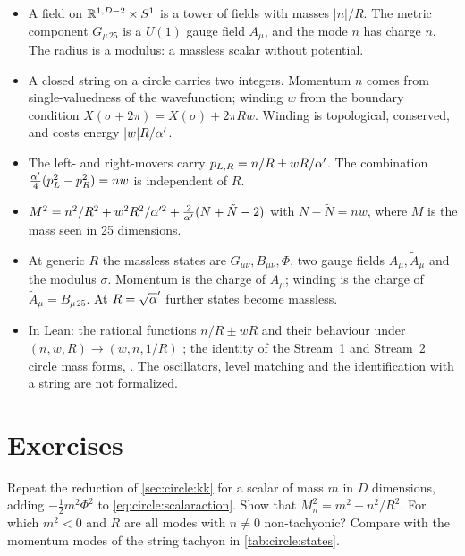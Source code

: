 \begin{summarybox}
\begin{itemize}[leftmargin=*]
\item A field on $\mathbb{R}^{1,D-2}\times S^1$ is a tower of fields with masses $|n|/R$. The metric
component $G_{\mu\,25}$ is a $U(1)$ gauge field $A_\mu$, and the mode $n$ has charge $n$. The
radius is a modulus: a massless scalar without potential.
\item A closed string on a circle carries two integers. Momentum $n$ comes from
single-valuedness of the wavefunction; winding $w$ from the boundary condition
$X(\sigma+2\pi)=X(\sigma)+2\pi Rw$. Winding is topological, conserved, and costs energy
$|w|R/\alpha'$.
\item The left- and right-movers carry $p_{L,R}=n/R\pm wR/\alpha'$. The combination
$\frac{\alpha'}4(p_L^2-p_R^2)=nw$ is independent of $R$.
\item $M^2=n^2/R^2+w^2R^2/\alpha'^2+\frac2{\alpha'}(N+\tilde N-2)$ with $N-\tilde N=nw$, where $M$ is
the mass seen in 25 dimensions.
\item At generic $R$ the massless states are $G_{\mu\nu},B_{\mu\nu},\Phi$, two gauge fields
$A_\mu,\tilde A_\mu$ and the modulus $\sigma$. Momentum is the charge of $A_\mu$; winding is
the charge of $\tilde A_\mu=B_{\mu\,25}$. At $R=\sqrt\ap$ further states become massless.
\item In Lean: the rational functions $n/R\pm wR$ and their behaviour under
$(n,w,R)\to(w,n,1/R)$ \TA; the identity of the Stream~1 and Stream~2 circle mass forms,
 \TA. The oscillators, level matching and the identification with a
string are not formalized.
\end{itemize}
\end{summarybox}

\section*{Exercises}

\begin{exercise}
Repeat the reduction of \cref{sec:circle:kk} for a scalar of mass $m$ in $D$ dimensions,
adding $-\frac12m^2\Phi^2$ to \eqref{eq:circle:scalaraction}. Show that
$M_n^2=m^2+n^2/R^2$. For which $m^2<0$ and $R$ are all modes with $n\neq0$ non-tachyonic?
Compare with the momentum modes of the string tachyon in \cref{tab:circle:states}.
\end{exercise}

